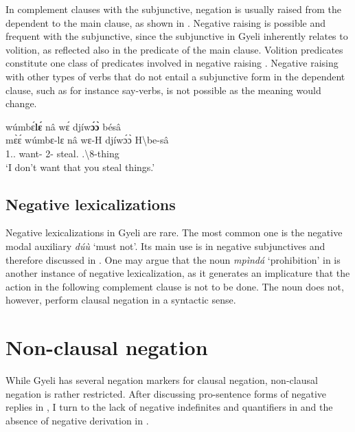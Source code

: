 \documentclass[output=paper,colorlinks=true, citecolor=brown,draftmode]{langscibook}
\begin{document}
In complement clauses with the subjunctive, negation is usually raised from the dependent to the main clause, as shown in . Negative raising is possible and frequent with the subjunctive, since the subjunctive in Gyeli inherently relates to volition, as reflected also in the predicate of the main clause. Volition predicates constitute one class of predicates involved in negative raising \citep{Horn1989}. Negative raising with other types of verbs that do not entail a subjunctive form in the dependent clause, such as for instance say-verbs, is not possible as the meaning would change. 

\begin{exe} \ex\label{duunat}
   wúmbɛ́{\bfseries lɛ́} nâ wɛ́  djíw{\bfseries ɔ́ɔ̀} bésâ \\
          mɛ̀ɛ́ wúmbɛ-lɛ nâ wɛ-H djíwɔ́ɔ̀ {H\backslash{}be-sâ}\\
             1.{\PRS}.{\NEG} want-{\NEG} {\COMP} 2{\SG}-{\PRS} steal.{\SBJV} {{\OBJ}.{\LINK}\backslash{}8-thing}\\
    \trans `I don't want that you steal things.'
\end{exe}

\subsection{Negative lexicalizations}

Negative lexicalizations in Gyeli are rare. The most common one is the negative modal auxiliary {\itshape dúù} `must not'. Its main use is in negative subjunctives and therefore discussed in .
One may argue that the noun {\itshape mpìndá}  `prohibition' in  is another instance of negative lexicalization, as it generates an implicature that the action in the following complement clause is not to be done. The noun does not, however, perform clausal negation in a syntactic sense.

\section{Non-clausal negation}
\label{sec:gye:3}

While Gyeli has several negation markers for clausal negation, non-clausal negation is rather restricted.
After discussing pro-sentence forms of negative replies in , I turn to the lack of negative indefinites and quantifiers in  and the absence of negative derivation in . 
\end{document}
